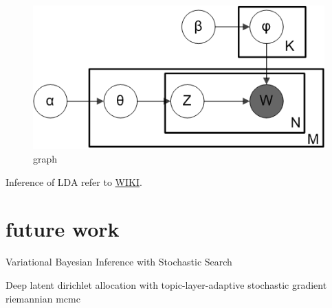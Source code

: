 \documentclass{article}
\begin{document}
\begin{figure}
\centering
\includegraphics[width = .5\textwidth]{lda.png}
\caption{graph}
\label{fig:lda}
\end{figure}

Inference of LDA refer to \href{https://en.wikipedia.org/wiki/Latent_Dirichlet_allocation}{WIKI}.
\section{future work}

Variational Bayesian Inference with Stochastic Search


Deep latent dirichlet allocation with topic-layer-adaptive stochastic gradient riemannian mcmc

\end{document}
